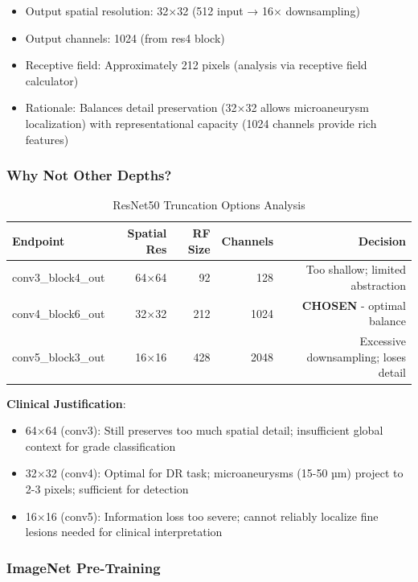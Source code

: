\documentclass[12pt,a4paper]{article}
\begin{document}
\begin{itemize}
    \item Output spatial resolution: 32×32 (512 input → 16× downsampling)
    \item Output channels: 1024 (from res4 block)
    \item Receptive field: Approximately 212 pixels (analysis via receptive field calculator)
    \item Rationale: Balances detail preservation (32×32 allows microaneurysm localization) with representational capacity (1024 channels provide rich features)
\end{itemize}

\subsubsection{Why Not Other Depths?}

\begin{table}[H]
\centering
\small
\caption{ResNet50 Truncation Options Analysis}
\begin{tabular}{|l|r|r|r|r|}
\hline
\textbf{Endpoint} & \textbf{Spatial Res} & \textbf{RF Size} & \textbf{Channels} & \textbf{Decision} \\
\hline
conv3\_block4\_out & 64×64 & 92 & 128 & Too shallow; limited abstraction \\
conv4\_block6\_out & 32×32 & 212 & 1024 & \textbf{CHOSEN} - optimal balance \\
conv5\_block3\_out & 16×16 & 428 & 2048 & Excessive downsampling; loses detail \\
\hline
\end{tabular}
\end{table}

\textbf{Clinical Justification}:
\begin{itemize}
    \item 64×64 (conv3): Still preserves too much spatial detail; insufficient global context for grade classification
    \item 32×32 (conv4): Optimal for DR task; microaneurysms (15-50 µm) project to 2-3 pixels; sufficient for detection
    \item 16×16 (conv5): Information loss too severe; cannot reliably localize fine lesions needed for clinical interpretation
\end{itemize}

\subsubsection{ImageNet Pre-Training}
\end{document}

